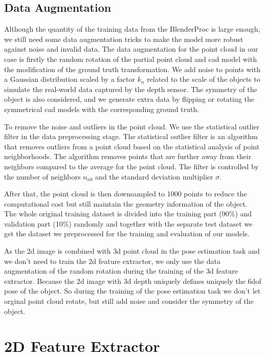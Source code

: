 \documentclass[12pt,DIV14,BCOR12mm,a4paper,footinclude=false,headinclude,parskip=half-,twoside,openright,cleardoublepage=empty,toc=index,bibliography=totoc,listof=totoc]{scrreprt}
\numberwithin{equation}{chapter}
\begin{document}
\subsection{Data Augmentation}
Although the quantity of the training data from the BlenderProc is large enough, we still need some data augmentation tricks to make the model more robust against noise and invalid data. The data augmentation for the point cloud in our case is firstly the random rotation of the partial point cloud and \gls{cad} model with the modification of the ground truth transformation. We add noise to points with a Gaussian distribution scaled by a factor $k_{n}$ related to the scale of the objects to simulate the real-world data captured by the depth sensor. The symmetry of the object is also considered, and we generate extra data by flipping or rotating the symmetrical \gls{cad} models with the corresponding ground truth. 

To remove the noise and outliers in the point cloud. We use the statistical outlier filter in the data preprocessing stage. The statistical outlier filter is an algorithm that removes outliers from a point cloud based on the statistical analysis of point neighborhoods. The algorithm removes points that are further away from their neighbors compared to the average for the point cloud. The filter is controlled by the number of neighbors $n_{nb}$ and the standard deviation multiplier $\sigma$.

After that, the point cloud is then downsampled to 1000 points to reduce the computational cost but still maintain the geometry information of the object. The whole original training dataset is divided into the training part (90\%) and validation part (10\%) randomly and together with the separate test dataset we get the dataset we preprocessed for the training and evaluation of our models.

As the \gls{2d} image is combined with \gls{3d} point cloud in the pose estimation task and we don't need to train the \gls{2d} feature extractor, we only use the data augmentation of the random rotation during the training of the \gls{3d} feature extractor. Because the \gls{2d} image with \gls{3d} depth uniquely defines uniquely the \gls{6dof} pose of the object. So during the training of the pose estimation task we don't let orginal point cloud rotate, but still add noise and consider the symmetry of the object.
\section{2D Feature Extractor}
\end{document}
